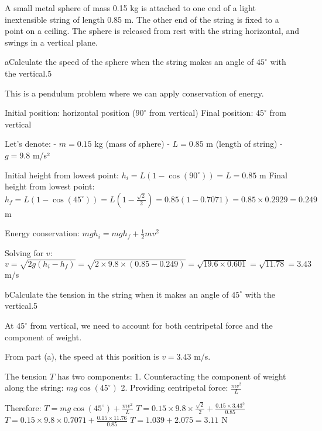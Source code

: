 \begin{problem}{15}
A small metal sphere of mass 0.15 kg is attached to one end of a light inextensible string of length 0.85 m. The other end of the string is fixed to a point on a ceiling. The sphere is released from rest with the string horizontal, and swings in a vertical plane.

\begin{part}{a}{Calculate the speed of the sphere when the string makes an angle of $45^\circ$ with the vertical.}{5}
\begin{solution}
This is a pendulum problem where we can apply conservation of energy.

Initial position: horizontal position ($90^\circ$ from vertical)
Final position: $45^\circ$ from vertical

Let's denote:
- $m = 0.15$ kg (mass of sphere)
- $L = 0.85$ m (length of string)
- $g = 9.8$ m/s²

Initial height from lowest point: $h_i = L(1 - \cos(90^\circ)) = L = 0.85$ m
Final height from lowest point: $h_f = L(1 - \cos(45^\circ)) = L(1 - \frac{\sqrt{2}}{2}) = 0.85(1 - 0.7071) = 0.85 \times 0.2929 = 0.249$ m

Energy conservation:
$mgh_i = mgh_f + \frac{1}{2}mv^2$

Solving for $v$:
$v = \sqrt{2g(h_i - h_f)} = \sqrt{2 \times 9.8 \times (0.85 - 0.249)} = \sqrt{19.6 \times 0.601} = \sqrt{11.78} = 3.43$ m/s

\end{solution}
\end{part}

\begin{part}{b}{Calculate the tension in the string when it makes an angle of $45^\circ$ with the vertical.}{5}
\begin{solution}
At $45^\circ$ from vertical, we need to account for both centripetal force and the component of weight.

From part (a), the speed at this position is $v = 3.43$ m/s.

The tension $T$ has two components:
1. Counteracting the component of weight along the string: $mg\cos(45^\circ)$
2. Providing centripetal force: $\frac{mv^2}{L}$

Therefore:
$T = mg\cos(45^\circ) + \frac{mv^2}{L}$
$T = 0.15 \times 9.8 \times \frac{\sqrt{2}}{2} + \frac{0.15 \times 3.43^2}{0.85}$
$T = 0.15 \times 9.8 \times 0.7071 + \frac{0.15 \times 11.76}{0.85}$
$T = 1.039 + 2.075 = 3.11$ N


\end{solution}
\end{part}
\end{problem}
